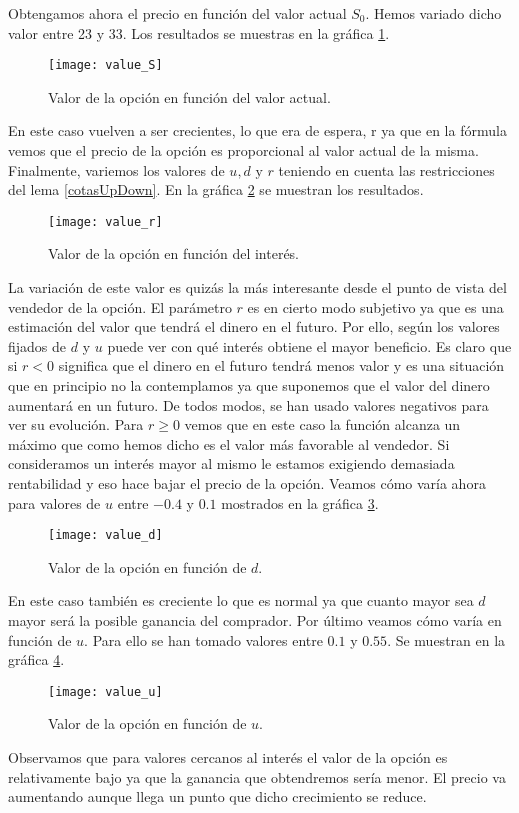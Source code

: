 Obtengamos ahora el precio en función del valor actual $ S_0 $. Hemos variado dicho valor entre 23 y 33. Los resultados se muestras en la gráfica \ref{valueS}. 

\begin{figure}[h!]
	\centering
	\texttt{[image: value\_S]}
	\caption{Valor de la opción en función del valor actual.}
	\label{valueS}
\end{figure}
En este caso vuelven a ser crecientes, lo que era de espera, r ya que en la fórmula vemos que el precio de la opción es proporcional al valor actual de la misma. Finalmente, variemos los valores de  $ u, d \text{ y } r$ teniendo en cuenta las restricciones del lema \ref{cotasUpDown}. En la gráfica \ref{valuer} se muestran los resultados.
\begin{figure}[h!]
	\centering
	\texttt{[image: value\_r]}
	\caption{Valor de la opción en función del interés.}
	\label{valuer}
\end{figure}
La variación de este valor es quizás la más interesante desde el punto de vista del vendedor de la opción. El parámetro $ r $ es en cierto modo subjetivo ya que es una estimación del valor que tendrá el dinero en el futuro. Por ello, según los valores fijados de $ d $ y $ u $ puede ver con qué interés obtiene el mayor beneficio. Es claro que si $ r < 0 $ significa que el dinero en el futuro tendrá menos valor y es una situación que en principio no la contemplamos ya que suponemos que el valor del dinero aumentará en un futuro. De todos modos, se han usado valores negativos para ver su evolución. Para $ r \geq 0 $ vemos que en este caso la función alcanza un máximo que como hemos dicho es el valor más favorable al vendedor. Si consideramos un interés mayor al mismo le estamos exigiendo demasiada rentabilidad y eso hace bajar el precio de la opción. Veamos cómo varía ahora para valores de $ u $ entre $ -0.4 $ y $ 0.1 $ mostrados en la gráfica \ref{valued}.
\begin{figure}[h!]
	\centering
	\texttt{[image: value\_d]}
	\caption{Valor de la opción en función de $ d $.}
	\label{valued}
\end{figure}
En este caso también es creciente lo que es normal ya que cuanto mayor sea $ d $ mayor será la posible ganancia del comprador. Por último veamos cómo varía en función de $ u $. Para ello se han tomado valores entre $ 0.1 $ y $ 0.55 $. Se muestran en la gráfica \ref{valueu}.
\begin{figure}[h!]
	\centering
	\texttt{[image: value\_u]}
	\caption{Valor de la opción en función de $ u $.}
	\label{valueu}
\end{figure}
Observamos que para valores cercanos al interés el valor de la opción es relativamente bajo ya que la ganancia que obtendremos sería menor. El precio va aumentando aunque llega un punto que dicho crecimiento se reduce.